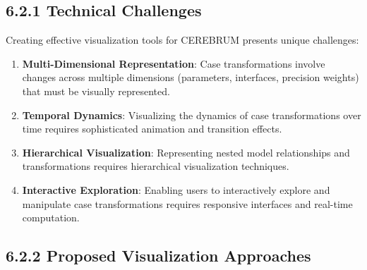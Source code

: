 \documentclass[
  11pt,
  letterpaper,
]{article}
\providecommand{\tightlist}{%
  \setlength{\itemsep}{0pt}\setlength{\parskip}{0pt}}
\begin{document}
\hypertarget{technical-challenges-1}{%
\subsection{6.2.1 Technical Challenges}\label{technical-challenges-1}}

Creating effective visualization tools for CEREBRUM presents unique
challenges:

\begin{enumerate}
\def\labelenumi{\arabic{enumi}.}
\tightlist
\item
  \textbf{Multi-Dimensional Representation}: Case transformations
  involve changes across multiple dimensions (parameters, interfaces,
  precision weights) that must be visually represented.
\item
  \textbf{Temporal Dynamics}: Visualizing the dynamics of case
  transformations over time requires sophisticated animation and
  transition effects.
\item
  \textbf{Hierarchical Visualization}: Representing nested model
  relationships and transformations requires hierarchical visualization
  techniques.
\item
  \textbf{Interactive Exploration}: Enabling users to interactively
  explore and manipulate case transformations requires responsive
  interfaces and real-time computation.
\end{enumerate}

\hypertarget{proposed-visualization-approaches}{%
\subsection{6.2.2 Proposed Visualization
Approaches}\label{proposed-visualization-approaches}}
\end{document}
